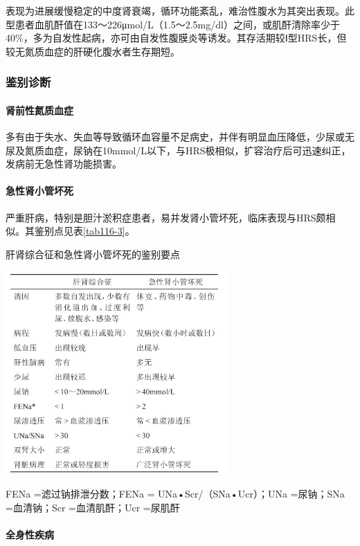 表现为进展缓慢稳定的中度肾衰竭，循环功能紊乱，难治性腹水为其突出表现。此型患者血肌酐值在133～226μmol/L（1.5～2.5mg/dl）之间，或肌酐清除率少于40\%，多为自发性起病，亦可由自发性腹膜炎等诱发。其存活期较Ⅰ型HRS长，但较无氮质血症的肝硬化腹水者生存期短。

\subsubsection{鉴别诊断}

\paragraph{肾前性氮质血症}

多有由于失水、失血等导致循环血容量不足病史，并伴有明显血压降低，少尿或无尿及氮质血症，尿钠在10mmol/L以下，与HRS极相似，扩容治疗后可迅速纠正，发病前无急性肾功能损害。

\paragraph{急性肾小管坏死}

严重肝病，特别是胆汁淤积症患者，易并发肾小管坏死，临床表现与HRS颇相似。其鉴别点见表\ref{tab116-3}。

\begin{table}[htbp]
\centering
\caption{肝肾综合征和急性肾小管坏死的鉴别要点}
\label{tab116-3}
\includegraphics[width=3.32292in,height=3.0625in]{./images/Image00494.jpg}
\end{table}

FENa =滤过钠排泄分数；FENa = UNa•Scr/（SNa•Ucr）；UNa =尿钠；SNa
=血清钠；Scr =血清肌酐；Ucr =尿肌酐

\paragraph{全身性疾病}

